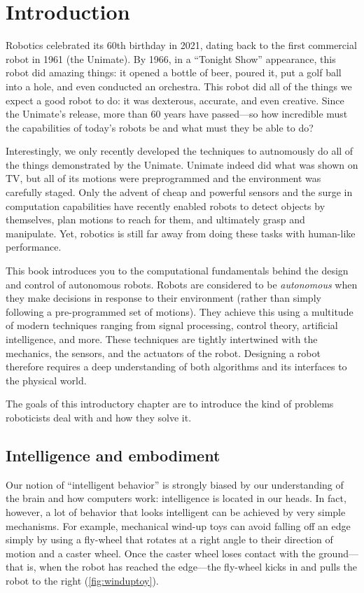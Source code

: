 \chapter{Introduction}\label{chap:introduction}

Robotics celebrated its 60th birthday in 2021, dating back to the first commercial robot in 1961 (the Unimate). By 1966, in a ``Tonight Show'' appearance, this robot did amazing things: it opened a bottle of beer, poured it, put a golf ball into a hole, and even conducted an orchestra. This robot did all of the things we expect a good robot to do: it was dexterous, accurate, and even creative. Since the Unimate's release, more than 60 years have passed---so how incredible must the capabilities of today's robots be and what must they be able to do?

Interestingly, we only recently developed the techniques to autnomously do all of the things demonstrated by the Unimate. Unimate indeed did what was shown on TV, but all of its motions were preprogrammed and the environment was carefully staged. Only the advent of cheap and powerful sensors and the surge in computation capabilities have recently enabled robots to detect objects by themselves, plan motions to reach for them, and ultimately grasp and manipulate. Yet, robotics is still far away from doing these tasks with human-like performance.

This book introduces you to the computational fundamentals behind the design and control of autonomous robots. Robots are considered to be \textsl{autonomous} when they make decisions in response to their environment (rather than simply following a pre-programmed set of motions). They achieve this using a multitude of modern techniques ranging from signal processing, control theory, artificial intelligence, and more. These techniques are tightly intertwined  with the mechanics, the sensors, and the actuators of the robot. Designing a robot therefore requires a deep understanding of both algorithms and its interfaces to the physical world.

The goals of this introductory chapter are to introduce the kind of problems roboticists deal with and how they solve it.

\section{Intelligence and embodiment}

Our notion of ``intelligent behavior'' is strongly biased by our understanding of the brain and how computers work: intelligence is located in our heads. In fact, however, a lot of behavior that looks intelligent can be achieved by very simple mechanisms. For example, mechanical wind-up toys can avoid falling off an edge simply by using a fly-wheel that rotates at a right angle to their direction of motion and a caster wheel. Once the caster wheel loses contact with the ground---that is, when the robot has reached the edge---the fly-wheel kicks in and pulls the robot to the right (\cref{fig:winduptoy}).


